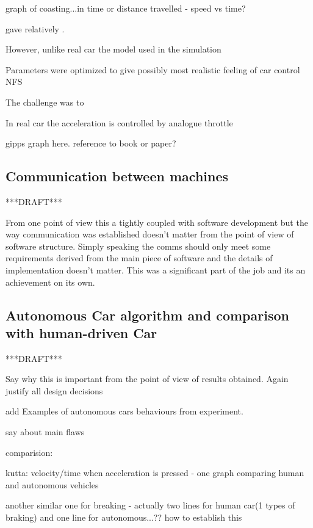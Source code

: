 \documentclass[11pt,english]{article}
\begin{document}
graph of coasting...in time or distance travelled - speed vs time?


gave relatively . 



However, unlike real car the model used in the simulation 


Parameters were optimized to give possibly most realistic feeling of car control NFS


The challenge was to 


In real car the acceleration is controlled by analogue throttle


gipps graph here. reference to book or paper?






\subsection{Communication between machines}

***DRAFT***

From one point of view this a tightly coupled with software development but the way
communication was established doesn’t matter from the point of view of software structure.
Simply speaking the comms should only meet some requirements derived from
the main piece of software and the details of implementation doesn’t matter. This was
a significant part of the job and its an achievement on its own.

\subsection{Autonomous Car algorithm and comparison with human-driven Car}

***DRAFT***



Say why this is important from the point of view of results obtained. Again justify all
design decisions


add Examples of autonomous cars behaviours from experiment. 

say about main flaws


comparision:


kutta:
velocity/time when acceleration is pressed  - one graph comparing human and autonomous vehicles



another similar one for breaking - actually two lines for human car(1 types of braking) and one line for autonomous...?? how to establish this
\end{document}
